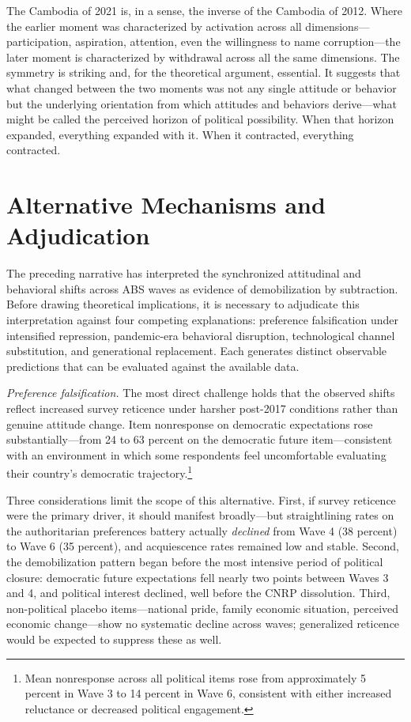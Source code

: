 \documentclass[Review,times,sageh,doublespace]{sagej}
\begin{document}
The Cambodia of 2021 is, in a sense, the inverse of the Cambodia of
2012. Where the earlier moment was characterized by activation across
all dimensions---participation, aspiration, attention, even the
willingness to name corruption---the later moment is characterized by
withdrawal across all the same dimensions. The symmetry is striking and,
for the theoretical argument, essential. It suggests that what changed
between the two moments was not any single attitude or behavior but the
underlying orientation from which attitudes and behaviors derive---what
might be called the perceived horizon of political possibility. When
that horizon expanded, everything expanded with it. When it contracted,
everything contracted.

\section{Alternative Mechanisms and
Adjudication}\label{alternative-mechanisms-and-adjudication}

The preceding narrative has interpreted the synchronized attitudinal and
behavioral shifts across ABS waves as evidence of demobilization by
subtraction. Before drawing theoretical implications, it is necessary to
adjudicate this interpretation against four competing explanations:
preference falsification under intensified repression, pandemic-era
behavioral disruption, technological channel substitution, and
generational replacement. Each generates distinct observable predictions
that can be evaluated against the available data.

\emph{Preference falsification.} The most direct challenge holds that
the observed shifts reflect increased survey reticence under harsher
post-2017 conditions rather than genuine attitude change. Item
nonresponse on democratic expectations rose substantially---from 24 to
63 percent on the democratic future item---consistent with an
environment in which some respondents feel uncomfortable evaluating
their country's democratic trajectory.\footnote{Mean nonresponse across
  all political items rose from approximately 5 percent in Wave 3 to 14
  percent in Wave 6, consistent with either increased reluctance or
  decreased political engagement.}

Three considerations limit the scope of this alternative. First, if
survey reticence were the primary driver, it should manifest
broadly---but straightlining rates on the authoritarian preferences
battery actually \emph{declined} from Wave 4 (38 percent) to Wave 6 (35
percent), and acquiescence rates remained low and stable. Second, the
demobilization pattern began before the most intensive period of
political closure: democratic future expectations fell nearly two points
between Waves 3 and 4, and political interest declined, well before the
CNRP dissolution. Third, non-political placebo items---national pride,
family economic situation, perceived economic change---show no
systematic decline across waves; generalized reticence would be expected
to suppress these as well.
\end{document}
